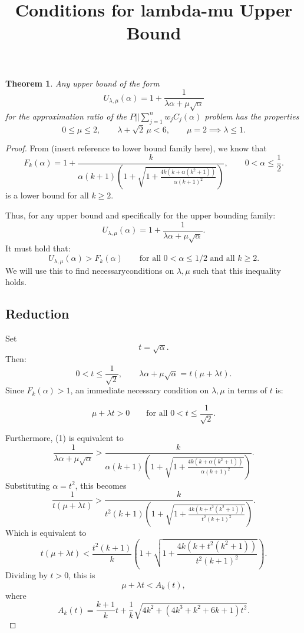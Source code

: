 \documentclass[11pt]{article}
\newtheorem{theorem}{Theorem}
\begin{document}
\title{Conditions for lambda-mu Upper Bound}
\author{}
\date{}
\maketitle

\begin{theorem}
Any upper bound of the form
\[
U_{\lambda,\mu}(\alpha)
=
1+\frac{1}{\lambda \alpha + \mu\sqrt{\alpha}}
\]
for the approximation ratio of the \(P||\sum_{j=1}^{n}w_jC_j(\alpha)\)
problem has the properties
\[
0\le \mu\le 2,
\qquad
\lambda+\sqrt2\,\mu<6,
\qquad
\mu=2\implies \lambda\le 1.
\]
\end{theorem}

\begin{proof}


From (insert reference to lower bound family here), we know that 
\[
F_k(\alpha)
=
1+
\frac{k}{
\alpha(k+1)\left(
1+\sqrt{
1+\frac{4k\left(k+\alpha(k^2+1)\right)}{\alpha(k+1)^2}
}
\right)
},
\qquad 0<\alpha\le \frac12.
\]
is a lower bound for all $k \ge 2$.

Thus, for any upper bound and specifically for the upper bounding family: 
\[
U_{\lambda,\mu}(\alpha)
=
1+\frac{1}{\lambda \alpha+\mu\sqrt{\alpha}}.
\]
It must hold that:
\[
U_{\lambda,\mu}(\alpha)>F_k(\alpha)
\qquad \text{for all } 0<\alpha\le 1/2 \text{ and all } k\ge 2.
\tag{1}
\]  
We will use this to find necessaryconditions on $\lambda,\mu$ such that this inequality holds.

\subsection*{Reduction}

Set
\[
t=\sqrt{\alpha}.
\]
Then:
\[
0<t\le \frac1{\sqrt2},
\qquad
\lambda \alpha+\mu\sqrt{\alpha}
=
t(\mu+\lambda t).
\]
Since \(F_k(\alpha)>1\), an immediate necessary condition on $\lambda,\mu$ in terms of $t$ is:  

\[
\mu+\lambda t>0
\qquad
\text{for all }0<t\le \frac1{\sqrt2}.
\]

Furthermore, (1) is equivalent to
\[
\frac{1}{\lambda \alpha+\mu\sqrt{\alpha}}
>
\frac{k}{
\alpha(k+1)\left(
1+\sqrt{
1+\frac{4k\left(k+\alpha(k^2+1)\right)}{\alpha(k+1)^2}
}
\right)
}.
\]
Substituting \(\alpha=t^2\), this becomes
\[
\frac{1}{t(\mu+\lambda t)}
>
\frac{k}{
t^2(k+1)\left(
1+\sqrt{
1+\frac{4k\left(k+t^2(k^2+1)\right)}{t^2(k+1)^2}
}
\right)
}.
\]
Which is equivalent to
\[
t(\mu+\lambda t)
<
\frac{t^2(k+1)}{k}
\left(
1+\sqrt{
1+\frac{4k\left(k+t^2(k^2+1)\right)}{t^2(k+1)^2}
}
\right).
\]
Dividing by \(t>0\), this is
\[
\mu+\lambda t<A_k(t),
\]
where
\[
A_k(t)
=
\frac{k+1}{k}t
+
\frac{1}{k}
\sqrt{
4k^2+\left(4k^3+k^2+6k+1\right)t^2
}.
\]


\end{proof}
\end{document}
